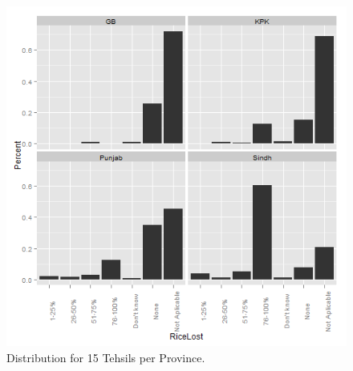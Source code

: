 \begin{figure}[!hbtp]
\begin{knitrout}
\color{fgcolor}

{\centering \includegraphics[width=.9\linewidth]{smallerDist/figures/fifteenDist} 

}


\end{knitrout}

\caption{Distribution for 15 Tehsils per Province.\label{fig:fifteenDist}}
\end{figure}

